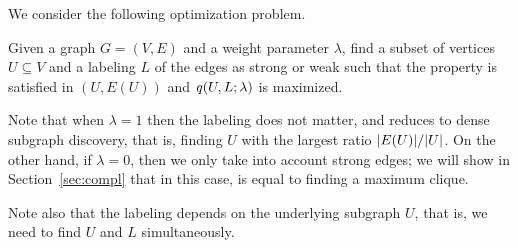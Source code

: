 We consider the following optimization problem. 

\begin{problem}[\prbstrwk]
\label{pr:label-subgrap-str-wk}
Given a graph $G = (V,E)$ and a weight parameter $\lambda$, find a subset of vertices $U \subseteq V$ and a labeling $L$ of the edges as {strong} or {weak}  such that the \stc property is satisfied in $(U, E(U))$ and  $\score{U, L; \lambda}$ is maximized.
\end{problem}



Note that when $\lambda = 1$ then the labeling does not matter, and \prbstrwk reduces to dense subgraph discovery, that is, finding $U$ with the largest ratio ${\left|E(U)\right|}/{\left|U\right|}$. On the other hand, if $\lambda = 0$, then we only take into account strong edges; we will show in Section~\ref{sec:compl} that in this case, \prbstrwk is equal to finding a maximum clique.


Note also that the labeling depends on the underlying subgraph $U$, that is, we need to find $U$ and $L$ simultaneously.